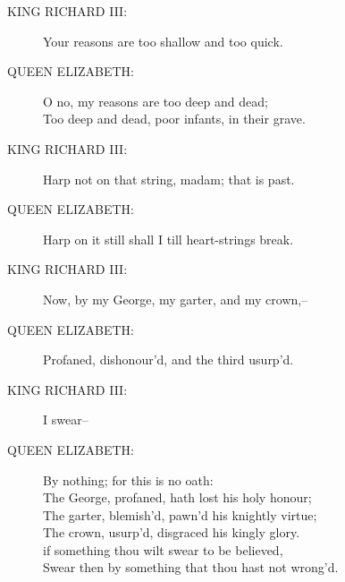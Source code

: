 \documentclass{article}
\begin{document}
\begin{description}
\item[KING RICHARD III:] 
\hspace{1pt}Your reasons are too shallow and too quick.\\
\end{description}
\begin{description}
\item[QUEEN ELIZABETH:] 
\hspace{1pt}O no, my reasons are too deep and dead;\\
\hspace{1pt}Too deep and dead, poor infants, in their grave.\\
\end{description}
\begin{description}
\item[KING RICHARD III:] 
\hspace{1pt}Harp not on that string, madam; that is past.\\
\end{description}
\begin{description}
\item[QUEEN ELIZABETH:] 
\hspace{1pt}Harp on it still shall I till heart-strings break.\\
\end{description}
\begin{description}
\item[KING RICHARD III:] 
\hspace{1pt}Now, by my George, my garter, and my crown,--\\
\end{description}
\begin{description}
\item[QUEEN ELIZABETH:] 
\hspace{1pt}Profaned, dishonour'd, and the third usurp'd.\\
\end{description}
\begin{description}
\item[KING RICHARD III:] 
\hspace{1pt}I swear--\\
\end{description}
\begin{description}
\item[QUEEN ELIZABETH:] 
\hspace{1pt}By nothing; for this is no oath:\\
\hspace{1pt}The George, profaned, hath lost his holy honour;\\
\hspace{1pt}The garter, blemish'd, pawn'd his knightly virtue;\\
\hspace{1pt}The crown, usurp'd, disgraced his kingly glory.\\
\hspace{1pt}if something thou wilt swear to be believed,\\
\hspace{1pt}Swear then by something that thou hast not wrong'd.\\
\end{description}
\end{document}
